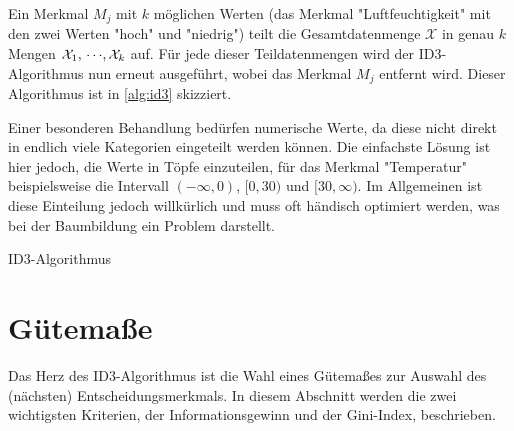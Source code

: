 		Ein Merkmal \(M_j\) mit \(k\) möglichen Werten (\bspw das Merkmal "Luftfeuchtigkeit" mit den zwei Werten "hoch" und "niedrig") teilt die Gesamtdatenmenge \( \mathcal{X} \) in genau \(k\) Mengen \( \mathcal{X}_1,\,\cdots\!,\mathcal{X}_k \) auf. Für jede dieser Teildatenmengen wird der ID3-Algorithmus nun erneut ausgeführt, wobei das Merkmal \(M_j\) entfernt wird. Dieser Algorithmus ist in \autoref{alg:id3} skizziert.

		Einer besonderen Behandlung bedürfen numerische Werte, da diese nicht direkt in endlich viele Kategorien eingeteilt werden können. Die einfachste Lösung ist hier jedoch, die Werte in Töpfe einzuteilen, für das Merkmal "Temperatur" beispielsweise die Intervall \( (-\infty, 0) \), \( [0, 30) \) und \( [30, \infty) \). Im Allgemeinen ist diese Einteilung jedoch willkürlich und muss oft händisch optimiert werden, was bei der Baumbildung ein Problem darstellt.

		\begin{algorithm}  \DontPrintSemicolon
			\caption{ID3-Algorithmus}
			\label{alg:id3}
		\end{algorithm}

	\section{Gütemaße}
		\label{sec:treeQualityMeasures}

		Das Herz des ID3-Algorithmus ist die Wahl eines Gütemaßes zur Auswahl des (nächsten) Entscheidungsmerkmals. In diesem Abschnitt werden die zwei wichtigsten Kriterien, der Informationsgewinn und der Gini-Index, beschrieben.

